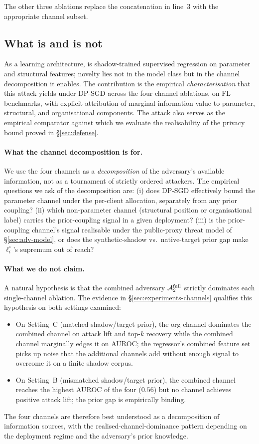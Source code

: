 The other three ablations replace the concatenation in line~3 with the
appropriate channel subset.

\subsection{What \TADI is and is not}
\label{sec:attack-positioning}

As a learning architecture, \TADI is shadow-trained supervised
regression on parameter and structural features; novelty lies not in
the model class but in the channel decomposition it enables. The
contribution is the empirical \emph{characterisation} that this attack
yields under DP-SGD across the four channel ablations, on FL
benchmarks, with explicit attribution of marginal information value to
parameter, structural, and organisational components. The attack also
serves as the empirical comparator against which we evaluate the
realisability of the privacy bound proved in \S\ref{sec:defense}.

\paragraph{What the channel decomposition is for.}
We use the four channels as a \emph{decomposition} of the adversary's
available information, not as a tournament of strictly ordered
attackers. The empirical questions we ask of the decomposition are:
(i) does DP-SGD effectively bound the parameter channel under the
per-client allocation, separately from any prior coupling?
(ii) which non-parameter channel (structural position or organisational
label) carries the prior-coupling signal in a given deployment?
(iii) is the prior-coupling channel's signal realisable under the
public-proxy threat model of \S\ref{sec:adv-model}, or does the
synthetic-shadow vs.\ native-target prior gap make
$\ell_i^\circ$'s supremum out of reach?

\paragraph{What we do not claim.}
A natural hypothesis is that the combined adversary $\mathcal{A}_2^{\text{full}}$
strictly dominates each single-channel ablation. The evidence in
\S\ref{sec:experiments-channels} qualifies this hypothesis on both
settings examined:

\begin{itemize}[topsep=2pt,itemsep=2pt,leftmargin=*]
\item On Setting~C (matched shadow/target prior), the org channel
  dominates the combined channel on attack lift and top-$k$ recovery
  while the combined channel marginally edges it on AUROC; the
  regressor's combined feature set picks up noise that the additional
  channels add without enough signal to overcome it on a finite
  shadow corpus.
\item On Setting~B (mismatched shadow/target prior), the combined
  channel reaches the highest AUROC of the four ($0.56$) but no
  channel achieves positive attack lift; the prior gap is empirically
  binding.
\end{itemize}

The four channels are therefore best understood as a decomposition
of information sources, with the realised-channel-dominance pattern
depending on the deployment regime and the adversary's prior
knowledge.
